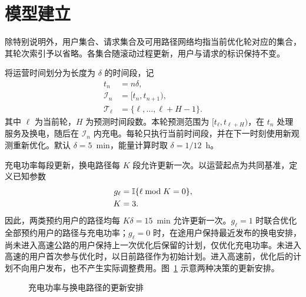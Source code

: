 \section{模型建立}

除特别说明外，用户集合、请求集合及可用路径网络均指当前优化轮对应的集合，其轮次索引予以省略。各集合随滚动过程更新，用户与请求的标识保持不变。

将运营时间划分为长度为 $\delta$ 的时间段，记
\begin{subequations}\label{eq:time_grid}
\begin{align}
t_n&=n\delta,\label{eq:time_points}\\
\mathcal I_n&=[t_n,t_{n+1}),\label{eq:time_intervals}\\
\mathcal T_\ell&=\{\ell,\ldots,\ell+H-1\}.\label{eq:prediction_indices}
\end{align}
\end{subequations}
其中 $\ell$ 为当前轮，$H$ 为预测时间段数。本轮预测范围为 $[t_\ell,t_{\ell+H})$，在 $t_n$ 处理服务及换电，随后在 $\mathcal I_n$ 内充电。每轮只执行当前时间段，并在下一时刻使用新观测重新优化。默认 $\delta=5$~min，能量计算时取 $\delta=1/12$~h。

充电功率每段更新，换电路径每 $K$ 段允许更新一次。以运营起点为共同基准，定义已知参数
\begin{subequations}\label{eq:update_clock}
\begin{align}
g_\ell&=\mathbb I\{\ell\bmod K=0\},\label{eq:path_update_indicator}\\
K&=3.\label{eq:path_update_interval}
\end{align}
\end{subequations}
因此，两类预约用户的路径均每 $K\delta=15$~min 允许更新一次。$g_\ell=1$ 时联合优化全部预约用户的路径与充电功率；$g_\ell=0$ 时，在途用户保持最近发布的换电安排，尚未进入高速公路的用户保持上一次优化后保留的计划，仅优化充电功率。未进入高速的用户首次参与优化时，以日前路径作为初始计划。进入高速前，优化后的计划不向用户发布，也不产生实际调整费用。图~\ref{fig:updates} 示意两种决策的更新安排。

\begin{figure}[!htbp]
\centering
{}
\caption{充电功率与换电路径的更新安排}
\label{fig:updates}
\end{figure}

